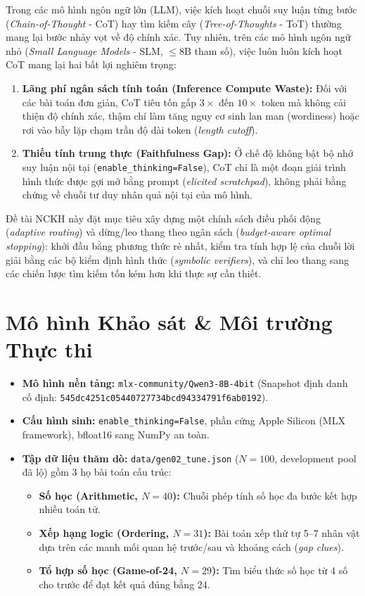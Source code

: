 \documentclass[11pt,a4paper]{report}
\begin{document}
Trong các mô hình ngôn ngữ lớn (LLM), việc kích hoạt chuỗi suy luận từng bước (\textit{Chain-of-Thought} - CoT) hay tìm kiếm cây (\textit{Tree-of-Thoughts} - ToT) thường mang lại bước nhảy vọt về độ chính xác. Tuy nhiên, trên các mô hình ngôn ngữ nhỏ (\textit{Small Language Models} - SLM, $\le 8\text{B}$ tham số), việc luôn luôn kích hoạt CoT mang lại hai bất lợi nghiêm trọng:
\begin{enumerate}[leftmargin=*]
    \item \textbf{Lãng phí ngân sách tính toán (Inference Compute Waste):} Đối với các bài toán đơn giản, CoT tiêu tốn gấp $3\times$ đến $10\times$ token mà không cải thiện độ chính xác, thậm chí làm tăng nguy cơ sinh lan man (wordiness) hoặc rơi vào bẫy lặp chạm trần độ dài token (\textit{length cutoff}).
    \item \textbf{Thiếu tính trung thực (Faithfulness Gap):} Ở chế độ không bật bộ nhớ suy luận nội tại (\texttt{enable\_thinking=False}), CoT chỉ là một đoạn giải trình hình thức được gợi mở bằng prompt (\textit{elicited scratchpad}), không phải bằng chứng về chuỗi tư duy nhân quả nội tại của mô hình.
\end{enumerate}

Đề tài NCKH này đặt mục tiêu xây dựng một chính sách điều phối động (\textit{adaptive routing}) và dừng/leo thang theo ngân sách (\textit{budget-aware optimal stopping}): khởi đầu bằng phương thức rẻ nhất, kiểm tra tính hợp lệ của chuỗi lời giải bằng các bộ kiểm định hình thức (\textit{symbolic verifiers}), và chỉ leo thang sang các chiến lược tìm kiếm tốn kém hơn khi thực sự cần thiết.

\section{Mô hình Khảo sát \& Môi trường Thực thi}
\begin{itemize}[leftmargin=*]
    \item \textbf{Mô hình nền tảng:} \texttt{mlx-community/Qwen3-8B-4bit} (Snapshot định danh cố định: \texttt{545dc4251c05440727734bcd94334791f6ab0192}).
    \item \textbf{Cấu hình sinh:} \texttt{enable\_thinking=False}, phần cứng Apple Silicon (MLX framework), bfloat16 sang NumPy an toàn.
    \item \textbf{Tập dữ liệu thăm dò:} \texttt{data/gen02\_tune.json} ($N=100$, development pool đã lộ) gồm 3 họ bài toán cấu trúc:
    \begin{itemize}
        \item \textbf{Số học (Arithmetic, $N=40$):} Chuỗi phép tính số học đa bước kết hợp nhiều toán tử.
        \item \textbf{Xếp hạng logic (Ordering, $N=31$):} Bài toán xếp thứ tự 5--7 nhân vật dựa trên các manh mối quan hệ trước/sau và khoảng cách (\textit{gap clues}).
        \item \textbf{Tổ hợp số học (Game-of-24, $N=29$):} Tìm biểu thức số học từ 4 số cho trước để đạt kết quả đúng bằng 24.
    \end{itemize}
\end{itemize}
\end{document}
